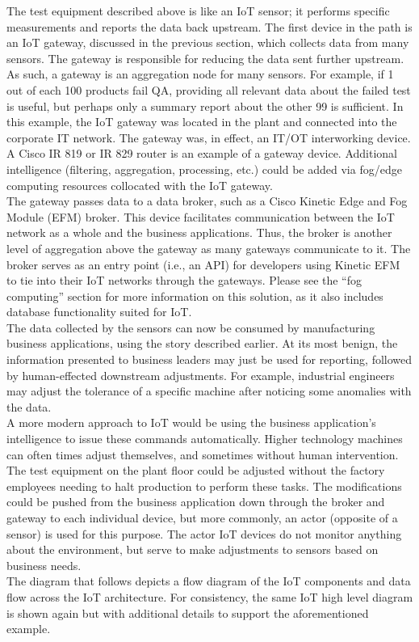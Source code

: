 The test equipment described above is like an IoT sensor; it performs specific
measurements and reports the data back upstream. The first device in the path
is an IoT gateway, discussed in the previous section, which collects data from
many sensors. The gateway is responsible for reducing the data sent further
upstream. As such, a gateway is an aggregation node for many sensors. For
example, if 1 out of each 100 products fail QA, providing all relevant data
about the failed test is useful, but perhaps only a summary report about the
other 99 is sufficient. In this example, the IoT gateway was located in the
plant and connected into the corporate IT network. The gateway was, in effect,
an IT/OT interworking device. A Cisco IR 819 or IR 829 router is an example of
a gateway device. Additional intelligence (filtering, aggregation, processing,
etc.) could be added via fog/edge computing resources collocated with the IoT
gateway. \\

The gateway passes data to a data broker, such as a Cisco Kinetic Edge and Fog
Module (EFM) broker. This device facilitates communication between the IoT
network as a whole and the business applications. Thus, the broker is another
level of aggregation above the gateway as many gateways communicate to it. The
broker serves as an entry point (i.e., an API) for developers using Kinetic
EFM to tie into their IoT networks through the gateways. Please see the ``fog
computing'' section for more information on this solution, as it also includes
database functionality suited for IoT. \\

The data collected by the sensors can now be consumed by manufacturing
business applications, using the story described earlier. At its most benign,
the information presented to business leaders may just be used for reporting,
followed by human-effected downstream adjustments. For example, industrial
engineers may adjust the tolerance of a specific machine after noticing some
anomalies with the data. \\

A more modern approach to IoT would be using the business application's
intelligence to issue these commands automatically. Higher technology machines
can often times adjust themselves, and sometimes without human intervention.
The test equipment on the plant floor could be adjusted without the factory
employees needing to halt production to perform these tasks. The modifications
could be pushed from the business application down through the broker and
gateway to each individual device, but more commonly, an actor (opposite of a
sensor) is used for this purpose. The actor IoT devices do not monitor
anything about the environment, but serve to make adjustments to sensors based
on business needs. \\

The diagram that follows depicts a flow diagram of the IoT components and data flow
across the IoT architecture. For consistency, the same IoT high level diagram
is shown again but with additional details to support the aforementioned example.

